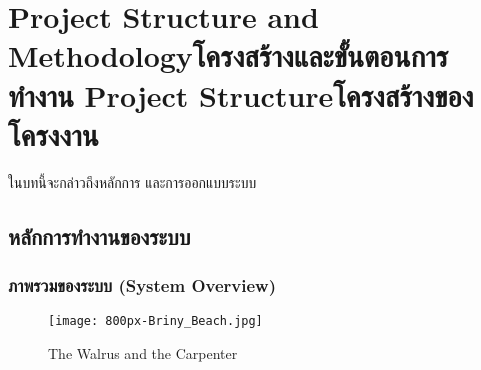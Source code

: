 \chapter{\ifproject%
      \ifenglish Project Structure and Methodology\else โครงสร้างและขั้นตอนการทำงาน\fi
  \else%
      \ifenglish Project Structure\else โครงสร้างของโครงงาน\fi
  \fi
 }

ในบทนี้จะกล่าวถึงหลักการ และการออกแบบระบบ

\makeatletter


\makeatother

\section{หลักการทำงานของระบบ}



\subsection{ภาพรวมของระบบ (System Overview)}
\begin{figure}[h]
    \begin{center}
        \texttt{[image: 800px-Briny\_Beach.jpg]}
    \end{center}
    \caption[Poem]{The Walrus and the Carpenter}
    \label{fig:walrus}
\end{figure}

